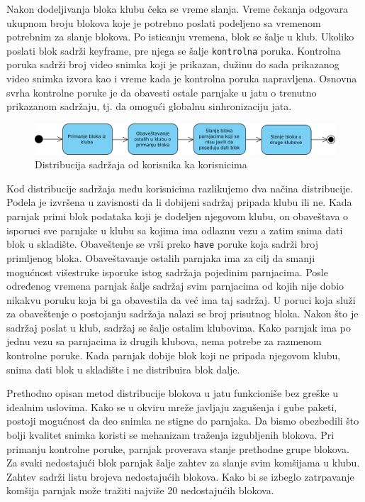 \documentclass[12pt,oneside]{memoir}
\begin{document}
Nakon dodeljivanja bloka klubu čeka se vreme slanja. Vreme čekanja odgovara ukupnom broju blokova koje je potrebno poslati podeljeno sa vremenom potrebnim za slanje blokova. Po isticanju vremena, blok se šalje u klub. Ukoliko poslati blok sadrži keyframe, pre njega se šalje \texttt{kontrolna} poruka. Kontrolna poruka sadrži broj video snimka koji je prikazan, dužinu do sada prikazanog video snimka izvora kao i vreme kada je kontrolna poruka napravljena. Osnovna svrha kontrolne poruke je da obavesti ostale parnjake u jatu o trenutno prikazanom sadržaju, tj. da omogući globalnu sinhronizaciju jata. 


\begin{figure}[!ht]
  \centering
  \includegraphics[width=1.05\textwidth]{slike/distribucija-jato.jpg}
  \caption{Distribucija sadržaja od korisnika ka korisnicima}
  \label{fig:distribucija-izvor}
\end{figure}
\par

Kod distribucije sadržaja među korisnicima razlikujemo dva načina distribucije. Podela je izvršena u zavisnosti da li dobijeni sadržaj pripada klubu ili ne. Kada parnjak primi blok podataka koji je dodeljen njegovom klubu, on obaveštava o isporuci sve parnjake u klubu sa kojima ima odlaznu vezu a zatim snima dati blok u skladište. Obaveštenje se vrši preko \texttt{have} poruke koja sadrži broj primljenog bloka. Obaveštavanje ostalih parnjaka ima za cilj da smanji mogućnost višestruke isporuke istog sadržaja pojedinim parnjacima. Posle određenog vremena parnjak šalje sadržaj svim parnjacima od kojih nije dobio nikakvu poruku koja bi ga obavestila da već ima taj sadržaj. U poruci koja služi za obaveštenje o postojanju sadržaja nalazi se broj prisutnog bloka. Nakon što je sadržaj poslat u klub, sadržaj se šalje ostalim klubovima. Kako parnjak ima po jednu vezu sa parnjacima iz drugih klubova, nema potrebe za razmenom kontrolne poruke. Kada parnjak dobije blok koji ne pripada njegovom klubu, snima dati blok u skladište i ne distribuira blok dalje. 

Prethodno opisan metod distribucije blokova u jatu funkcioniše bez greške u idealnim uslovima.
Kako se u okviru mreže javljaju zagušenja i gube paketi, postoji mogućnost da deo snimka ne stigne do parnjaka. Da bismo obezbedili što bolji kvalitet snimka koristi se mehanizam traženja izgubljenih blokova. Pri primanju kontrolne poruke, parnjak proverava stanje prethodne grupe blokova. Za svaki nedostajući blok parnjak šalje zahtev za slanje svim komšijama u klubu. Zahtev sadrži listu brojeva nedostajućih blokova. Kako bi se izbeglo zatrpavanje komšija parnjak može tražiti najviše 20 nedostajućih blokova.
 
\end{document}
